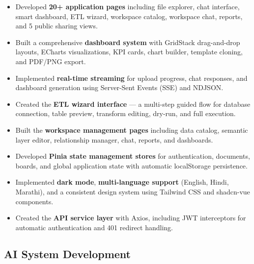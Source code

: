 \documentclass[12pt,a4paper]{report}
\begin{document}
\begin{itemize}[leftmargin=1.5cm]
    \item Developed \textbf{20+ application pages} including file explorer, chat interface, smart dashboard, ETL wizard, workspace catalog, workspace chat, reports, and 5 public sharing views.
    \item Built a comprehensive \textbf{dashboard system} with GridStack drag-and-drop layouts, ECharts visualizations, KPI cards, chart builder, template cloning, and PDF/PNG export.
    \item Implemented \textbf{real-time streaming} for upload progress, chat responses, and dashboard generation using Server-Sent Events (SSE) and NDJSON.
    \item Created the \textbf{ETL wizard interface} --- a multi-step guided flow for database connection, table preview, transform editing, dry-run, and full execution.
    \item Built the \textbf{workspace management pages} including data catalog, semantic layer editor, relationship manager, chat, reports, and dashboards.
    \item Developed \textbf{Pinia state management stores} for authentication, documents, boards, and global application state with automatic localStorage persistence.
    \item Implemented \textbf{dark mode}, \textbf{multi-language support} (English, Hindi, Marathi), and a consistent design system using Tailwind CSS and shadcn-vue components.
    \item Created the \textbf{API service layer} with Axios, including JWT interceptors for automatic authentication and 401 redirect handling.
\end{itemize}

\subsection{AI System Development}
\end{document}
